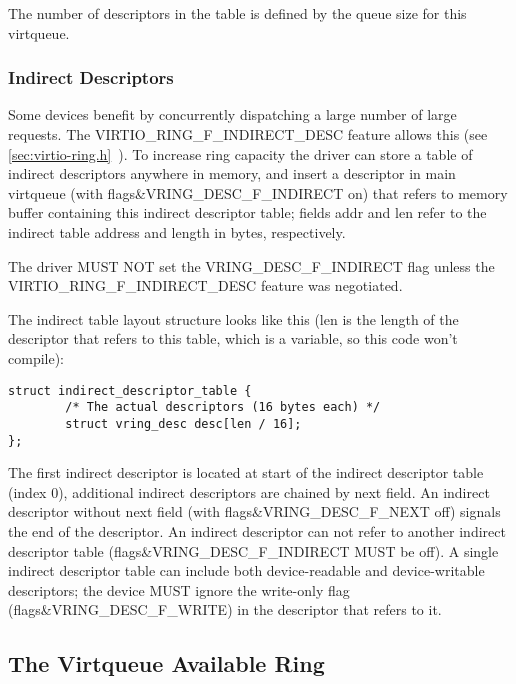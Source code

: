 The number of descriptors in the table is defined by the queue size
for this virtqueue.

\subsubsection{Indirect Descriptors}\label{sec:Basic Facilities of a Virtio Device / Virtqueues / The Virtqueue Descriptor Table / Indirect Descriptors}

Some devices benefit by concurrently dispatching a large number
of large requests. The VIRTIO_RING_F_INDIRECT_DESC feature allows this (see \ref{sec:virtio-ring.h}~). To increase
ring capacity the driver can store a table of indirect
descriptors anywhere in memory, and insert a descriptor in main
virtqueue (with flags\&VRING_DESC_F_INDIRECT on) that refers to memory buffer
containing this indirect descriptor table; fields addr and len
refer to the indirect table address and length in bytes,
respectively.

The driver MUST NOT set the VRING_DESC_F_INDIRECT flag unless the
VIRTIO_RING_F_INDIRECT_DESC feature was negotiated.

The indirect table layout structure looks like this
(len is the length of the descriptor that refers to this table,
which is a variable, so this code won't compile):

\begin{lstlisting}
struct indirect_descriptor_table {
        /* The actual descriptors (16 bytes each) */
        struct vring_desc desc[len / 16];
};
\end{lstlisting}

The first indirect descriptor is located at start of the indirect
descriptor table (index 0), additional indirect descriptors are
chained by next field. An indirect descriptor without next field
(with flags\&VRING_DESC_F_NEXT off) signals the end of the descriptor.
An
indirect descriptor can not refer to another indirect descriptor
table (flags\&VRING_DESC_F_INDIRECT MUST be off). A single indirect descriptor
table can include both device-readable and device-writable descriptors;
the device MUST ignore the write-only flag (flags\&VRING_DESC_F_WRITE) in the descriptor that refers to it.

\subsection{The Virtqueue Available Ring}\label{sec:Basic Facilities of a Virtio Device / Virtqueues / The Virtqueue Available Ring}

